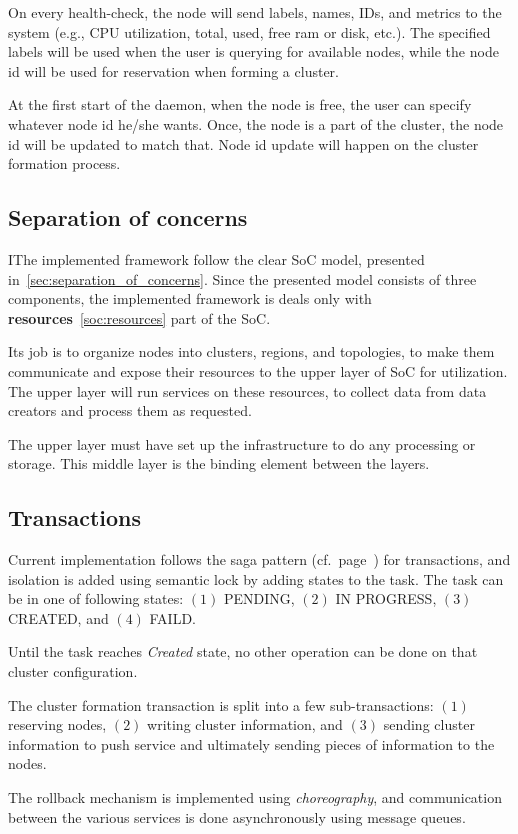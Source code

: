 On every health-check, the node will send labels, names, IDs, and metrics to the system (e.g., CPU utilization, total, used, free ram or disk, etc.). The specified labels will be used when the user is querying for available nodes, while the node id will be used for reservation when forming a cluster.

At the first start of the daemon, when the node is free, the user can specify whatever node id he/she wants. Once, the node is a part of the cluster, the node id will be updated to match that. Node id update will happen on the cluster formation process.
%
%
\subsection{Separation of concerns}\label{sec:framework_SoC}
%
IThe implemented framework follow the clear SoC model, presented in~\ref{sec:separation_of_concerns}. Since the presented model consists of three components, the implemented framework is deals only with \textbf{resources}~\ref{soc:resources} part of the SoC. 

Its job is to organize nodes into clusters, regions, and topologies, to make them communicate and expose their resources to the upper layer of SoC for utilization. The upper layer will run services on these resources, to collect data from data creators and process them as requested.

The upper layer must have set up the infrastructure to do any processing or storage. This middle layer is the binding element between the layers.
%
%
\subsection{Transactions}\label{sec:transaction}
%
Current implementation follows the saga pattern (cf.~page~\pageref{sec:sagas}) for transactions, and isolation is added using semantic lock by adding states to the task. The task can be in one of following states: $(1)$ PENDING, $(2)$ IN PROGRESS, $(3)$ CREATED, and $(4)$ FAILD. 

Until the task reaches \emph{Created} state, no other operation can be done on that cluster configuration.

The cluster formation transaction is split into a few sub-transactions: $(1)$ reserving nodes, $(2)$ writing cluster information, and $(3)$ sending cluster information to push service and ultimately sending pieces of information to the nodes. 

The rollback mechanism is implemented using \emph{choreography}, and communication between the various services is done asynchronously using message queues.
%
%
